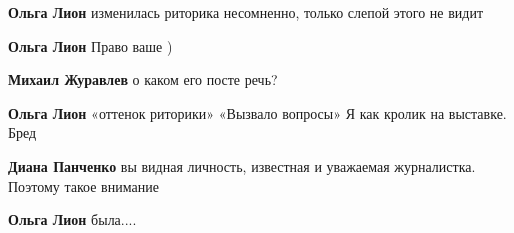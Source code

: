 \begin{itemize}
\begin{itemize}
 
\textbf{Ольга Лион} изменилась риторика несомненно, только слепой этого не видит


 
\textbf{Ольга Лион} Право ваше )

 
\textbf{Михаил Журавлев} о каком его посте речь?


 
\textbf{Ольга Лион} «оттенок риторики»
«Вызвало вопросы»
Я как кролик на выставке. Бред

 
\textbf{Диана Панченко} вы видная личность, известная и уважаемая журналистка. Поэтому такое внимание

 
\textbf{Ольга Лион} была....

 

\end{itemize}
\end{itemize}
